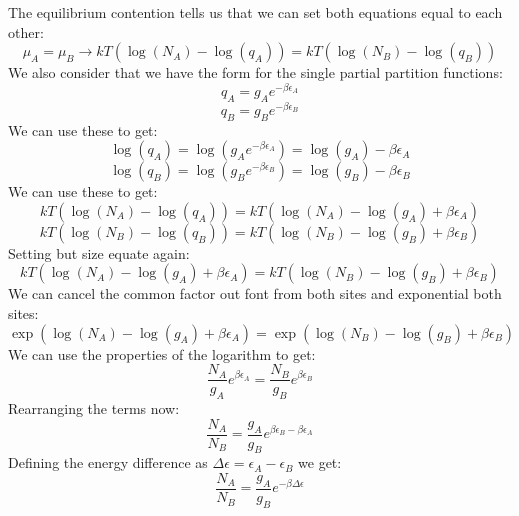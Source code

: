 \documentclass[12pt]{article}
\begin{document}
The equilibrium contention tells us that we can set both equations equal to each other:
\begin{equation}
  \mu_A = \mu_B \rightarrow kT \left(\log{\left(N_{A} \right)} - \log{\left(q_{A} \right)}\right) = kT \left(\log{\left(N_{B} \right)} - \log{\left(q_{B} \right)}\right)
\end{equation}
We also consider that we have the form for the single partial partition functions:
\begin{equation}
  q_A = g_A e^{-\beta \epsilon_A}
\end{equation}
\begin{equation}
  q_B = g_B e^{-\beta \epsilon_B}
\end{equation}
We can use these to get:
\begin{equation}
  \log{\left(q_{A} \right)} = \log{\left(g_A e^{-\beta \epsilon_A} \right)} = \log{\left(g_A \right)} - \beta \epsilon_A
\end{equation}
\begin{equation}
  \log{\left(q_{B} \right)} = \log{\left(g_B e^{-\beta \epsilon_B} \right)} = \log{\left(g_B \right)} - \beta \epsilon_B
\end{equation}
We can use these to get:
\begin{equation}
  kT \left(\log{\left(N_{A} \right)} - \log{\left(q_{A} \right)}\right) = kT \left(\log{\left(N_{A} \right)} - \log{\left(g_A \right)} + \beta \epsilon_A\right)
\end{equation}
\begin{equation}
  kT \left(\log{\left(N_{B} \right)} - \log{\left(q_{B} \right)}\right) = kT \left(\log{\left(N_{B} \right)} - \log{\left(g_B \right)} + \beta \epsilon_B\right)
\end{equation}
Setting but size equate again:
\begin{equation}
  kT \left(\log{\left(N_{A} \right)} - \log{\left(g_A \right)} + \beta \epsilon_A\right) = kT \left(\log{\left(N_{B} \right)} - \log{\left(g_B \right)} + \beta \epsilon_B\right)
\end{equation}
We can cancel the common factor out font from both sites and exponential both sites:
\begin{equation}
  \exp{\left(\log{\left(N_{A} \right)} - \log{\left(g_A \right)} + \beta \epsilon_A\right)} = \exp{\left(\log{\left(N_{B} \right)} - \log{\left(g_B \right)} + \beta \epsilon_B\right)}
\end{equation}
We can use the properties of the logarithm to get:
\begin{equation}
  \frac{N_A}{g_A} e^{\beta \epsilon_A} = \frac{N_B}{g_B} e^{\beta \epsilon_B}
\end{equation}
Rearranging the terms now:
\begin{equation}
  \frac{N_A}{N_B} = \frac{g_A}{g_B} e^{\beta \epsilon_B - \beta \epsilon_A}
\end{equation}
Defining the energy difference as $\Delta \epsilon = \epsilon_A - \epsilon_B$ we get:
\begin{equation}
  \frac{N_A}{N_B} = \frac{g_A}{g_B} e^{-\beta \Delta \epsilon}
\end{equation}
\end{document}

